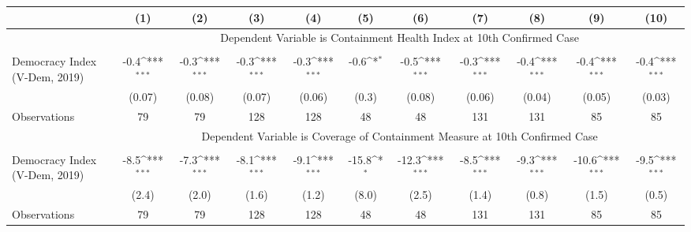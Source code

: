 {
\def\sym#1{\ifmmode^{#1}\else\(^{#1}\)\fi}
\begin{tabular}{l*{10}{c}}
\hline\hline
&\multicolumn{1}{c}{(1)}         &\multicolumn{1}{c}{(2)}         &\multicolumn{1}{c}{(3)}         &\multicolumn{1}{c}{(4)}         &\multicolumn{1}{c}{(5)}         &\multicolumn{1}{c}{(6)}         &\multicolumn{1}{c}{(7)}         &\multicolumn{1}{c}{(8)}         &\multicolumn{1}{c}{(9)}         &\multicolumn{1}{c}{(10)}         \\
\hline & \multicolumn{10}{c}{Dependent Variable is Containment Health Index at 10th Confirmed Case} \\\cline{2-11}\\[-1.8ex]
Democracy Index (V-Dem, 2019)&        -0.4\sym{***}&        -0.3\sym{***}&        -0.3\sym{***}&        -0.3\sym{***}&        -0.6\sym{*}  &        -0.5\sym{***}&        -0.3\sym{***}&        -0.4\sym{***}&        -0.4\sym{***}&        -0.4\sym{***}\\
&      (0.07)         &      (0.08)         &      (0.07)         &      (0.06)         &       (0.3)         &      (0.08)         &      (0.06)         &      (0.04)         &      (0.05)         &      (0.03)         \\
\hline
Observations        &          79         &          79         &         128         &         128         &          48         &          48         &         131         &         131         &          85         &          85         \\

& \multicolumn{10}{c}{Dependent Variable is Coverage of Containment Measure at 10th Confirmed Case} \\\cline{2-11}\\[-1.8ex]
Democracy Index (V-Dem, 2019)&        -8.5\sym{***}&        -7.3\sym{***}&        -8.1\sym{***}&        -9.1\sym{***}&       -15.8\sym{*}  &       -12.3\sym{***}&        -8.5\sym{***}&        -9.3\sym{***}&       -10.6\sym{***}&        -9.5\sym{***}\\
&       (2.4)         &       (2.0)         &       (1.6)         &       (1.2)         &       (8.0)         &       (2.5)         &       (1.4)         &       (0.8)         &       (1.5)         &       (0.5)         \\
\hline
Observations        &          79         &          79         &         128         &         128         &          48         &          48         &         131         &         131         &          85         &          85         \\


\end{tabular}}
